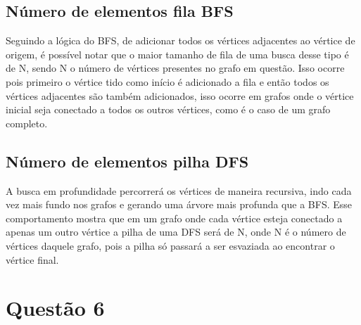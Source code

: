 \documentclass{article}
\begin{document}
\subsection{Número de elementos fila BFS}

Seguindo a lógica do BFS, de adicionar todos os vértices adjacentes ao vértice de origem, é possível notar que o maior tamanho de fila de uma busca desse tipo é de N, sendo N o número de vértices presentes no grafo em questão. Isso ocorre pois primeiro o vértice tido como início é adicionado a fila e então todos os vértices adjacentes são também adicionados, isso ocorre em grafos onde o vértice inicial seja conectado a todos os outros vértices, como é o caso de um grafo completo.

\subsection{Número de elementos pilha DFS}

A busca em profundidade percorrerá os vértices de maneira recursiva, indo cada vez mais fundo nos grafos e gerando uma árvore mais profunda que a BFS. Esse comportamento mostra que em um grafo onde cada vértice esteja conectado a apenas um outro vértice a pilha de uma DFS será de N, onde N é o número de vértices daquele grafo, pois a pilha só passará a ser esvaziada ao encontrar o vértice final.


\newpage
\section{Questão 6}
\end{document}
